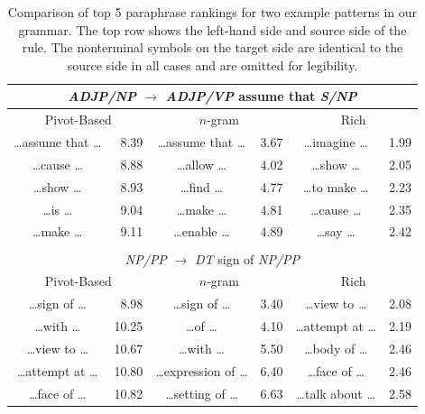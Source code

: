 \documentclass[11pt]{article}
\begin{document}
\begin{table}[!t]
\begin{center}
\begin{tabular}{|cr|cr|cr|}
  \hline
  \multicolumn{6}{|c|}{\emph{ADJP/NP} $\rightarrow$ \emph{ADJP/VP}
    assume that \emph{S/NP}} \\
  \hline
  \multicolumn{2}{|c|}{Pivot-Based} &
  \multicolumn{2}{c|}{$n$-gram} &
  \multicolumn{2}{c|}{Rich} \\
  \hline
  \ldots assume that \ldots & 8.39 &
  \ldots assume that \ldots & 3.67 &
  \ldots imagine \ldots & 1.99 \\

  \ldots cause \ldots & 8.88 &
  \ldots allow \ldots & 4.02 &
  \ldots show \ldots & 2.05 \\

  \ldots show \ldots & 8.93 &
  \ldots find \ldots & 4.77 &
  \ldots to make \ldots & 2.23 \\

  \ldots is \ldots & 9.04 &
  \ldots make \ldots & 4.81 &
  \ldots cause \ldots & 2.35 \\

  \ldots make \ldots & 9.11 &
  \ldots enable \ldots & 4.89 &
  \ldots say \ldots & 2.42 \\

  \hline
  \multicolumn{6}{c}{} \\
  \hline
  \multicolumn{6}{|c|}{\emph{NP/PP} $\rightarrow$ \emph{DT}
    sign of \emph{NP/PP}} \\
  \hline
  \multicolumn{2}{|c|}{Pivot-Based} &
  \multicolumn{2}{c|}{$n$-gram} &
  \multicolumn{2}{c|}{Rich} \\
  \hline

  \ldots sign of \ldots & 8.98 &
  \ldots sign of \ldots & 3.40 &
  \ldots view to \ldots & 2.08 \\

  \ldots with \ldots & 10.25 &
  \ldots of \ldots & 4.10 &
  \ldots attempt at \ldots & 2.19 \\

  \ldots view to \ldots & 10.67 &
  \ldots with \ldots & 5.50 &
  \ldots body of \ldots & 2.46 \\

  \ldots attempt at \ldots & 10.80 &
  \ldots expression of \ldots & 6.40 &
  \ldots face of \ldots & 2.46 \\

  \ldots face of \ldots & 10.82 &
  \ldots setting of \ldots & 6.63 &
  \ldots talk about \ldots & 2.58 \\

  \hline
\end{tabular}
\end{center}
\normalsize
\caption{Comparison of top 5 paraphrase rankings for two example patterns in
  our grammar. The top row shows the left-hand side and source side of
  the rule. The nonterminal symbols on the target side are identical
  to the source side in all cases and are omitted for legibility.}
\label{tab-ranking}
\end{table}
\end{document}
